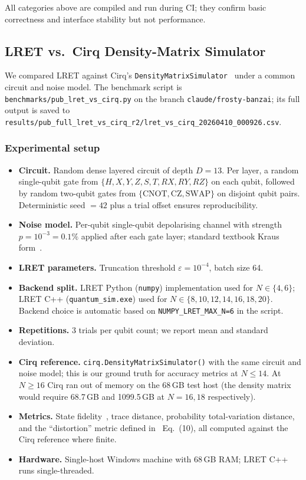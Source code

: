 \documentclass[11pt,a4paper]{article}
\begin{document}
All categories above are compiled and run during CI; they confirm basic correctness
and interface stability but not performance.

\subsection{LRET vs.\ Cirq Density-Matrix Simulator}
\label{sec:bench}

We compared LRET against Cirq's \texttt{DensityMatrixSimulator}~\cite{cirq} under a
common circuit and noise model. The benchmark script is
\nolinkurl{benchmarks/pub_lret_vs_cirq.py} on the branch
\texttt{claude/frosty-banzai}; its full output is saved to
\nolinkurl{results/pub_full_lret_vs_cirq_r2/lret_vs_cirq_20260410_000926.csv}.

\subsubsection*{Experimental setup}

\begin{itemize}
  \item \textbf{Circuit.} Random dense layered circuit of depth $D = 13$. Per layer,
        a random single-qubit gate from $\{H, X, Y, Z, S, T, RX, RY, RZ\}$ on each
        qubit, followed by random two-qubit gates from $\{\text{CNOT}, \text{CZ},
        \text{SWAP}\}$ on disjoint qubit pairs. Deterministic seed $=42$ plus a
        trial offset ensures reproducibility.
  \item \textbf{Noise model.} Per-qubit single-qubit depolarising channel
        with strength $p = 10^{-3} = 0.1\%$ applied after each gate layer;
        standard textbook Kraus form~\cite{nielsenchuang2010}.
  \item \textbf{LRET parameters.} Truncation threshold $\varepsilon = 10^{-4}$,
        batch size 64.
  \item \textbf{Backend split.} LRET Python (\texttt{numpy}) implementation used for
        $N \in \{4,6\}$; LRET C++ (\texttt{quantum\_sim.exe}) used for
        $N \in \{8,10,12,14,16,18,20\}$. Backend choice is automatic based on
        \texttt{NUMPY\_LRET\_MAX\_N=6} in the script.
  \item \textbf{Repetitions.} 3 trials per qubit count; we report mean and standard
        deviation.
  \item \textbf{Cirq reference.} \texttt{cirq.DensityMatrixSimulator()} with the same
        circuit and noise model; this is our ground truth for accuracy metrics at
        $N \le 14$. At $N \ge 16$ Cirq ran out of memory on the 68\,GB test host
        (the density matrix would require 68.7\,GB and 1099.5\,GB at $N=16,18$
        respectively).
  \item \textbf{Metrics.} State fidelity~\cite{nielsenchuang2010}, trace distance,
        probability total-variation distance, and the ``distortion'' metric defined
        in~\cite{chen2021lret} Eq.\ (10), all computed against the Cirq reference
        where finite.
  \item \textbf{Hardware.} Single-host Windows machine with 68\,GB RAM; LRET C++
        runs single-threaded.
\end{itemize}
\end{document}
